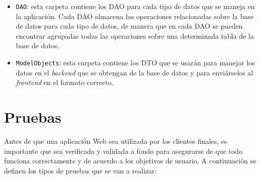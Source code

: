 \begin{itemize}
\begin{itemize}
    
        \item \texttt{DAO}: esta carpeta contiene los DAO para cada tipo de datos que se maneja en la aplicación. Cada DAO almacena las operaciones relacionadas sobre la base de datos para cada tipo de datos, de manera que en cada DAO se pueden encontrar agrupadas todas las operaciones sobre una determinada tabla de la base de datos.
        \item \texttt{ModelObjects}: esta carpeta contiene los DTO que se usarán para manejar los datos en el \textit{backend} que se obtengan de la base de datos y para enviárselos al \textit{frontend} en el formato correcto.
    \end{itemize}
\end{itemize}

       


\section{Pruebas}
Antes de que una aplicación Web sea utilizada por los clientes finales, es importante que sea verificada y validada a fondo para asegurarse de que todo funciona correctamente y de acuerdo a los objetivos de usuario. A continuación se definen los tipos de pruebas que se van a realizar:
